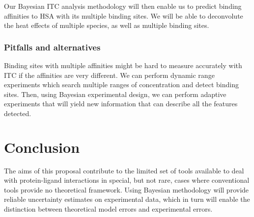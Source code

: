 \documentclass[10pt,final]{article}
\begin{document}

Our Bayesian ITC analysis methodology will then enable us to predict binding affinities to HSA with its multiple binding sites. We will be able to deconvolute the heat effects of multiple species, as well as multiple binding sites.

\subsubsection*{Pitfalls and alternatives}
Binding sites with multiple affinities might be hard to measure accurately with ITC if the affinities are very different. We can perform dynamic range experiments which search multiple ranges of concentration and detect binding sites. Then, using Bayesian experimental design, we can perform adaptive experiments that will yield new information that can describe all the features detected.


\section*{Conclusion}
The aims of this proposal contribute to the limited set of tools available to deal with protein-ligand interactions in special, but not rare, cases where conventional tools provide no theoretical framework. Using Bayesian methodology will provide reliable uncertainty estimates on experimental data, which in turn will enable the distinction between theoretical model errors and experimental errors.

\printbibliography
\end{document}
